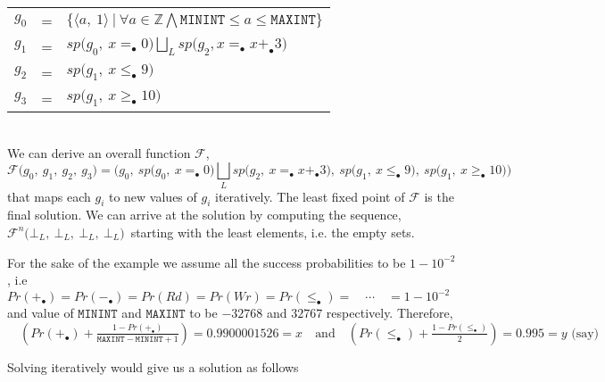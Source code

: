 \documentclass[final,3p, review, times]{util/elsarticle}
\begin{document}
\begin{tabular}{lcl}
$g_0$ & = & $\Big\{\big\langle a,\ 1\big\rangle\ \big|\ \forall a\in\mathbb{Z}\bigwedge\mathtt{MININT}\leq a\leq\mathtt{MAXINT}\Big\}$ \\
$g_1$ & = & $\displaystyle sp\big(g_0,\ x =_\bullet 0\big)\bigsqcup_L sp\big(g_2, x =_\bullet x +_\bullet 3\big)$ \\
$g_2$ & = & $sp\big(g_1,\ x \leq_\bullet9\big)$ \\
$g_3$ & = & $sp\big(g_1,\ x \geq_\bullet10\big)$ \\
\end{tabular}\\

We can derive an overall function $\mathcal{F}$,
$$\mathcal{F}\big(g_0,\ g_1,\ g_2,\ g_3\big) = \Big(g_0,\ sp\big(g_0,\ x =_\bullet 0\big)\bigsqcup_L sp\big(g_2,\ x =_\bullet x +_\bullet 3\big),\ sp\big(g_1,\ x \leq_\bullet 9\big),\ sp\big(g_1,\ x \geq_\bullet 10\big)\Big)$$
that maps each $g_i$ to new values of $g_i$ iteratively. The least fixed point of $\mathcal{F}$ is the final solution. We can arrive at the solution by computing the sequence, $\mathcal{F}^n\big(\bot_L,\ \bot_L,\ \bot_L,\ \bot_L\big)$\ starting with the least elements, i.e. the empty sets.

For the sake of the example we assume all the success probabilities to be $1-10^{-2}$, i.e $Pr(+_\bullet)=Pr(-_\bullet)=Pr(Rd)=Pr(Wr)=Pr(\leq_\bullet)=\quad\cdots\quad=1-10^{-2}$ and value of $\mathtt{MININT}$ and $\mathtt{MAXINT}$ to be $-32768$ and $32767$ respectively. Therefore, $\displaystyle\quad\left(Pr(+_\bullet)+\frac{1-Pr(+_\bullet)}{\mathtt{MAXINT}-\mathtt{MININT}+1}\right)=0.9900001526=x\quad\text{and}\quad\left(Pr(\leq_\bullet)+\frac{1-Pr(\leq_\bullet)}{2}\right)=0.995=y\text{ (say)}$

Solving iteratively would give us a solution as follows
\end{document}
